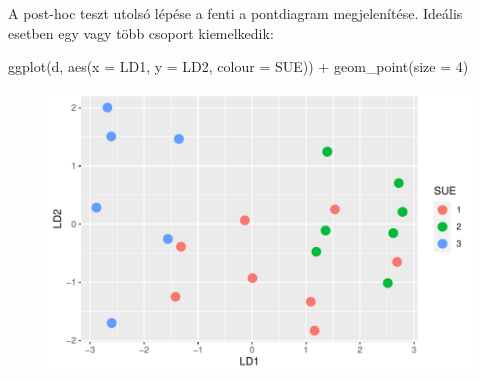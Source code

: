 \documentclass[
  letterpaper,
]{krantz}
\makeatletter
\newenvironment{Shaded}{\begin{snugshade}}{\end{snugshade}}
\newcommand{\AttributeTok}[1]{\textcolor[rgb]{0.40,0.45,0.13}{#1}}
\newcommand{\CommentTok}[1]{\textcolor[rgb]{0.37,0.37,0.37}{#1}}
\newcommand{\DecValTok}[1]{\textcolor[rgb]{0.68,0.00,0.00}{#1}}
\newcommand{\FunctionTok}[1]{\textcolor[rgb]{0.28,0.35,0.67}{#1}}
\newcommand{\NormalTok}[1]{\textcolor[rgb]{0.00,0.23,0.31}{#1}}
\newcommand{\OtherTok}[1]{\textcolor[rgb]{0.00,0.23,0.31}{#1}}
\newcommand{\SpecialCharTok}[1]{\textcolor[rgb]{0.37,0.37,0.37}{#1}}
\newenvironment{kframe}{%
\medskip{}
\setlength{\fboxsep}{.8em}
 \def\at@end@of@kframe{}%
 \ifinner\ifhmode%
  \def\at@end@of@kframe{\end{minipage}}%
  \begin{minipage}{\columnwidth}%
 \fi\fi%
 \def\FrameCommand##1{\hskip\@totalleftmargin \hskip-\fboxsep
 \colorbox{shadecolor}{##1}\hskip-\fboxsep
     \hskip-\linewidth \hskip-\@totalleftmargin \hskip\columnwidth}%
 \MakeFramed {\advance\hsize-\width
   \@totalleftmargin\z@ \linewidth\hsize
   \@setminipage}}%
 {\par\unskip\endMakeFramed%
 \at@end@of@kframe}
\renewenvironment{Shaded}{\begin{kframe}}{\end{kframe}}
\makeatother
\begin{document}
A post-hoc teszt utolsó lépése a fenti a pontdiagram megjelenítése.
Ideális esetben egy vagy több csoport kiemelkedik:

\begin{Shaded}
\end{Shaded}

\begin{Shaded}
\begin{Highlighting}[]
\FunctionTok{ggplot}\NormalTok{(d, }\FunctionTok{aes}\NormalTok{(}\AttributeTok{x =}\NormalTok{ LD1, }\AttributeTok{y =}\NormalTok{ LD2, }\AttributeTok{colour =}\NormalTok{ SUE)) }\SpecialCharTok{+} \FunctionTok{geom\_point}\NormalTok{(}\AttributeTok{size =} \DecValTok{4}\NormalTok{)}
\end{Highlighting}
\end{Shaded}

\begin{figure}[H]

{\centering \includegraphics{./sec_tobbvaltozos_variancia_files/figure-pdf/unnamed-chunk-10-1.pdf}

}

\end{figure}
\end{document}
